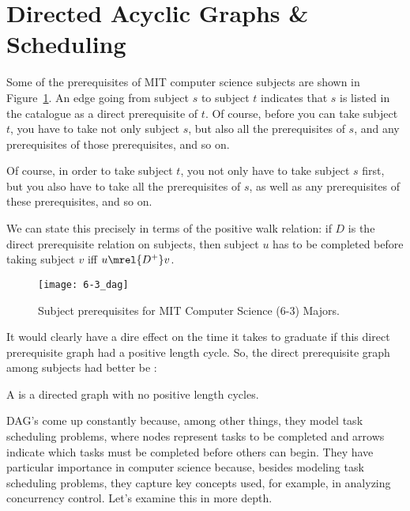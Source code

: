 \begin{problems}
\practiceproblems
{}

\homeworkproblems
{}
\end{problems}

\section{Directed Acyclic Graphs \& Scheduling}\label{dag_sec}

Some of the prerequisites of MIT computer science subjects are shown
in Figure~\ref{6-3_subjects}.  An edge going from subject $s$ to
subject $t$ indicates that $s$ is listed in the catalogue as a direct
prerequisite of $t$.  Of course, before you can take subject $t$, you
have to take not only subject $s$, but also all the prerequisites of $s$,
and any prerequisites of those prerequisites, and so
on.  \begin{editingnotes} Of course, in order to take subject $t$, you
  not only have to take subject $s$ first, but you also have to take
  all the prerequisites of $s$, as well as any prerequisites of these
  prerequisites, and so on.
\end{editingnotes}  We can state this precisely in terms
of the positive walk relation: if $D$ is the direct prerequisite
relation on subjects, then subject $u$ has to be completed before
taking subject $v$ iff $u \mrel{D^+} v$.

\begin{figure}

\texttt{[image: 6-3\_dag]}

\caption{Subject prerequisites for MIT Computer Science (6-3) Majors.}

\label{6-3_subjects}

\end{figure}

It would clearly have a dire effect on the time it takes to graduate
if this direct prerequisite graph had a positive length cycle. So,
the direct prerequisite graph among subjects had better be
:

\begin{definition}
A  is a directed graph with no
positive length cycles.
\end{definition}

DAG's come up constantly because, among other things, they model task
scheduling problems, where nodes represent tasks to be completed and
arrows indicate which tasks must be completed before others can begin.
They have particular importance in computer science because, besides
modeling task scheduling problems, they capture key concepts used, for
example, in analyzing concurrency control. Let's examine this in more depth.


